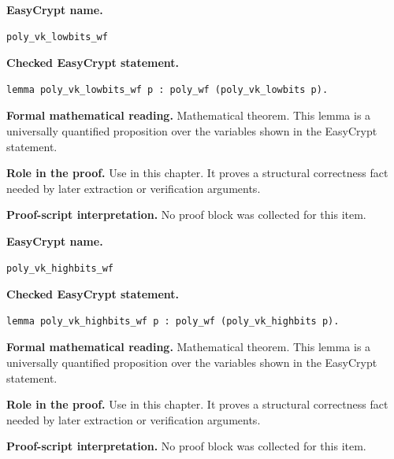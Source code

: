 \begin{formaltheorem}
\noindent\textbf{EasyCrypt name.}
\begin{lstlisting}[language=EasyCrypt,basicstyle=\ttfamily\scriptsize]
poly_vk_lowbits_wf
\end{lstlisting}
\noindent\textbf{Checked EasyCrypt statement.}
\begin{lstlisting}[language=EasyCrypt,basicstyle=\ttfamily\scriptsize]
lemma poly_vk_lowbits_wf p : poly_wf (poly_vk_lowbits p).
\end{lstlisting}
\noindent\textbf{Formal mathematical reading.}
Mathematical theorem. This lemma is a universally quantified proposition over the variables shown in the EasyCrypt statement.

\noindent\textbf{Role in the proof.}
Use in this chapter. It proves a structural correctness fact needed by later extraction or verification arguments.

\noindent\textbf{Proof-script interpretation.}
No proof block was collected for this item.

\end{formaltheorem}

\begin{formaltheorem}
\noindent\textbf{EasyCrypt name.}
\begin{lstlisting}[language=EasyCrypt,basicstyle=\ttfamily\scriptsize]
poly_vk_highbits_wf
\end{lstlisting}
\noindent\textbf{Checked EasyCrypt statement.}
\begin{lstlisting}[language=EasyCrypt,basicstyle=\ttfamily\scriptsize]
lemma poly_vk_highbits_wf p : poly_wf (poly_vk_highbits p).
\end{lstlisting}
\noindent\textbf{Formal mathematical reading.}
Mathematical theorem. This lemma is a universally quantified proposition over the variables shown in the EasyCrypt statement.

\noindent\textbf{Role in the proof.}
Use in this chapter. It proves a structural correctness fact needed by later extraction or verification arguments.

\noindent\textbf{Proof-script interpretation.}
No proof block was collected for this item.

\end{formaltheorem}


